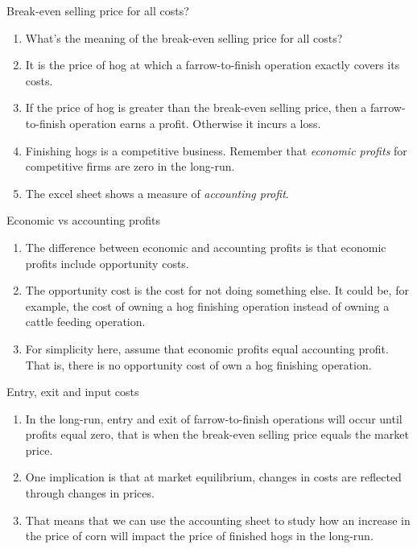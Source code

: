 \documentclass[table,xcolor=pdftex,dvipsnames, handout]{beamer}\usepackage[]{graphicx}\usepackage[]{color}
\begin{document}

\begin{frame}{Break-even selling price for all costs?}
\begin{enumerate}[label=\textbullet]
  \item What's the meaning of the break-even selling price for all costs?
  \item It is the price of hog at which a farrow-to-finish operation exactly covers its costs.
  \item If the price of hog is greater than the break-even selling price, then a farrow-to-finish operation earns a profit. Otherwise it incurs a loss.
  \item Finishing hogs is a competitive business. Remember that \emph{economic profits} for competitive firms are zero in the long-run.
  \item The excel sheet shows a measure of \emph{accounting profit}.
\end{enumerate}
\end{frame}


\begin{frame}{Economic vs accounting profits}
\begin{enumerate}[label=\textbullet]
  \item The difference between economic and accounting profits is that economic profits include opportunity costs.
  \item The opportunity cost is the cost for not doing something else. It could be, for example, the cost of owning a hog finishing operation instead of owning a cattle feeding operation.
  \item For simplicity here, assume that economic profits equal accounting profit. That is, there is no opportunity cost of own a hog finishing operation.
\end{enumerate}
\end{frame}


\begin{frame}{Entry, exit and input costs}
\begin{enumerate}[label=\textbullet]
  \item In the long-run, entry and exit of farrow-to-finish operations will occur until profits equal zero, that is when the break-even selling price equals the market price.
  \item One implication is that at market equilibrium, changes in costs are reflected through changes in prices.
  \item That means that we can use the accounting sheet to study how an increase in the price of corn will impact the price of finished hogs in the long-run.
\end{enumerate}
\end{frame}
\end{document}
